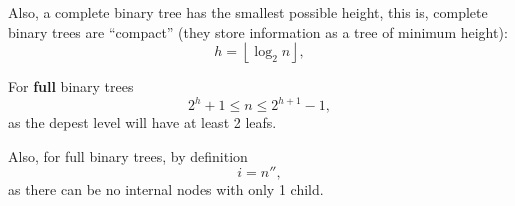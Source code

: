 Also, a complete binary tree has the smallest possible height,
this is, complete binary trees are ``compact''
(they store information as a tree of minimum height):
\begin{equation}
  h = \left \lfloor{\log_2 n}\right \rfloor,
\end{equation}

\separator

For \textbf{full} binary trees
\begin{equation}
  2^h + 1 \le n \le 2^{h+1} - 1,
\end{equation}
as the depest level will have at least 2 leafs.

Also, for full binary trees, by definition
\begin{equation}
  i = n'',
\end{equation}
as there can be no internal nodes with only 1 child.

